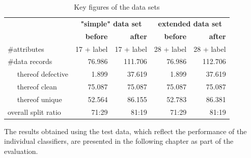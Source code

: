 \begin{table}[ht]
\centering
\caption{Key figures of the data sets}
\label{tab:dataset-numbers-new}
\begin{tabular}{|l|r|r|r|r|} 
\hline
\multirow{2}{*}{}    & \multicolumn{2}{c|}{\textbf{"simple" data set}} & \multicolumn{2}{c|}{\textbf{extended data set}}  \\ 
\cline{2-5}
                     & \textbf{before} & \textbf{after}                & \textbf{before} & \textbf{after}                 \\ 
\hline
\#attributes         & 17 + label      & 17 + label                    & 28 + label      & 28 + label                     \\ 
\hline
\#data records       & 76.986          & 111.706                       & 76.986          & 112.706                        \\ 
\hline
~ ~thereof defective & 1.899           & 37.619                        & 1.899           & 37.619                         \\ 
\hline
~ ~thereof clean     & 75.087          & 75.087                        & 75.087          & 75.087                         \\ 
\hline
~ ~thereof unique    & 52.564          & 86.155                        & 52.783          & 86.381                         \\ 
\hline
overall split ratio  & 71:29           & 81:19                         & 71:29           & 81:19                          \\
\hline
\end{tabular}
\end{table}

The results obtained using the test data, which reflect the performance of the individual classifiers, are presented in the following chapter as part of the evaluation.


